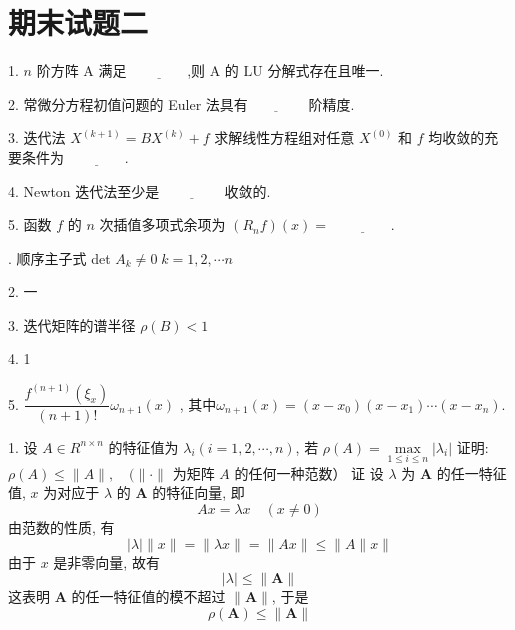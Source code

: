 \newpage
\section{期末试题二}
\begin{tcolorbox}[breakable,
		colframe=white!10!jingga, coltitle=white!90!jingga, colback=white!95!jingga, coltext=black, colbacktitle=white!10!jingga, enhanced, fonttitle=\bfseries,fontupper=\normalsize, attach boxed title to top left={yshift=-2mm}, before skip=8pt, after skip=8pt,
		title=填空题]
 

1. $ n $ 阶方阵 $ \mathrm{A} $ 满足 $\underline{\hspace{4em}}$,则 $ \mathrm{A} $ 的 $ \mathrm{LU} $ 分解式存在且唯一.

2. 常微分方程初值问题的 Euler 法具有$\underline{\hspace{4em}}$ 阶精度.

3. 迭代法 $ X^{(k+1)}=B X^{(k)}+f $ 求解线性方程组对任意 $ X^{(0)} $ 和 $ f $ 均收敛的充要条件为 $\underline{\hspace{4em}}$.

4. Newton 迭代法至少是 $\underline{\hspace{4em}}$ 收敛的.

5. 函数 $ f $ 的 $ n $ 次插值多项式余项为 $ \left(R_{n} f\right)(x)= $ $\underline{\hspace{4em}}$.


 . 顺序主子式 det $A_k\neq 0\; k=1,2,\cdots n$

2. 一

3. 迭代矩阵的谱半径 $\rho (B)<1$

4. 1

5. $ \dfrac{f^{(n+1)}\left(\xi_{x}\right)}{(n+1)!} \omega_{n+1}(x)$ , 其中$ \omega_{n+1}(x)=\left(x-x_{0}\right)\left(x-x_{1}\right) \cdots\left(x-x_{n}\right)$.
\end{tcolorbox}

\begin{tcolorbox}[breakable,
		colframe=white!10!jingga, coltitle=white!90!jingga, colback=white!95!jingga, coltext=black, colbacktitle=white!10!jingga, enhanced, fonttitle=\bfseries,fontupper=\normalsize, attach boxed title to top left={yshift=-2mm}, before skip=8pt, after skip=8pt,
		title=解答题]

1. 设 $ A \in R^{n \times n} $ 的特征值为 $ \lambda_{i}(i=1,2, \cdots, n) $, 若 $ \rho(A)=\max\limits _{1\leqslant i\leqslant  n}\left|\lambda_{i}\right| $
证明: $ \rho(A) \leqslant \|A\|, \quad(\|\cdot \| $ 为矩阵 $A$ 的任何一种范数）
   \tcblower
证 \; 设 $ \lambda $ 为 $ \boldsymbol{A} $ 的任一特征值, $ x $ 为对应于 $ \lambda $ 的 $ \boldsymbol{A} $ 的特征向量, 即
$$
A x=\lambda x \quad(x \neq 0)
$$
由范数的性质, 有
$$
|\lambda|\|x\|=\|\lambda x\|=\|A x\| \leqslant\|A\| x \|
$$
由于 $ x $ 是非零向量, 故有
$$
|\lambda| \leqslant\|\boldsymbol{A}\|
$$
这表明 $ \boldsymbol{A} $ 的任一特征值的模不超过 $ \|\boldsymbol{A}\| $, 于是
$$
\rho(\boldsymbol{A}) \leqslant\|\boldsymbol{A}\|
$$
\end{tcolorbox}



